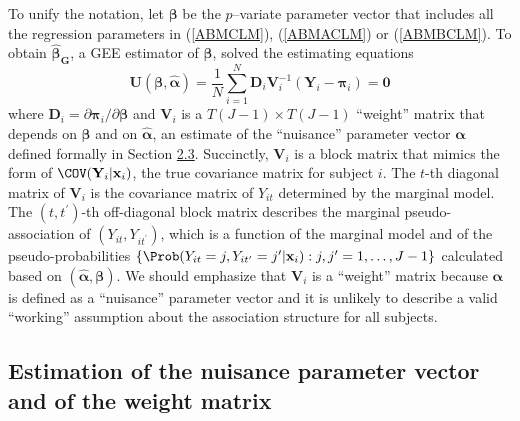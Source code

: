 \documentclass[
]{jss}
\begin{document}
To unify the notation, let \(\boldsymbol \beta\) be the \(p\)--variate
parameter vector that includes all the regression parameters in
(\ref{ABMCLM}), (\ref{ABMACLM}) or (\ref{ABMBCLM}). To obtain
\(\boldsymbol {\widehat \beta_G}\), a GEE estimator of
\(\boldsymbol \beta\), \citet{Touloumis2012} solved the estimating
equations \begin{equation}
\mathbf{U}(\boldsymbol \beta,\widehat{\boldsymbol \alpha})=\frac{1}{N}\sum_{i=1}^N \mathbf{D}_i \mathbf V^{-1}_{i} (\mathbf {Y}_i-\boldsymbol{\pi}_i)=\mathbf{0}
\label{EEbeta}
\end{equation} where
\(\mathbf{D}_i=\partial \boldsymbol{\pi}_i/\partial \boldsymbol{\beta}\)
and \(\mathbf V_i\) is a \(T(J-1) \times T(J-1)\) ``weight'' matrix that
depends on \(\boldsymbol \beta\) and on
\(\widehat{\boldsymbol \alpha}\), an estimate of the ``nuisance''
parameter vector \(\boldsymbol \alpha\) defined formally in Section
\protect\hyperlink{Alpha}{2.3}. Succinctly, \(\mathbf V_i\) is a block
matrix that mimics the form of \(\COV(\mathbf{Y}_i|\mathbf x_i)\), the
true covariance matrix for subject \(i\). The \(t\)-th diagonal matrix
of \(\mathbf V_i\) is the covariance matrix of \(Y_{it}\) determined by
the marginal model. The \((t,t^{\prime})\)-th off-diagonal block matrix
describes the marginal pseudo-association of
\((Y_{it},Y_{it^{\prime}})\), which is a function of the marginal model
and of the pseudo-probabilities
\(\{\Prob(Y_{it}=j,Y_{it^{\prime}}=j^{\prime}|\mathbf x_i):j,j^{\prime}=1,\ldots,J-1\}\)
calculated based on
\((\widehat{\boldsymbol \alpha},\boldsymbol \beta)\). We should
emphasize that \(\mathbf V_i\) is a ``weight'' matrix because
\(\boldsymbol \alpha\) is defined as a ``nuisance'' parameter vector and
it is unlikely to describe a valid ``working'' assumption about the
association structure for all subjects.

\hypertarget{Alpha}{%
\subsection{Estimation of the nuisance parameter vector and of the
weight matrix}\label{Alpha}}
\end{document}
